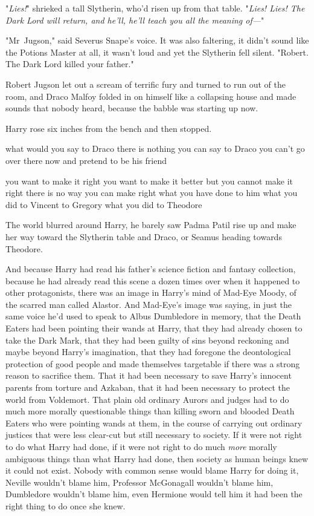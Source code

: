 "\emph{Lies!}" shrieked a tall Slytherin, who’d risen up from that table.
"\emph{Lies! Lies! The Dark Lord will return, and he’ll, he’ll teach you all
the meaning of—}"

"Mr~Jugson," said Severus Snape’s voice. It was also faltering, it didn’t
sound like the Potions Master at all, it wasn’t loud and yet the Slytherin fell
silent. "Robert. The Dark Lord killed your father."

Robert Jugson let out a scream of terrific fury and turned to run out of the
room, and Draco Malfoy folded in on himself like a collapsing house and made
sounds that nobody heard, because the babble was starting up now.

Harry rose six inches from the bench and then stopped.

what would you say to Draco there is nothing you can say to Draco you can’t go
over there now and pretend to be his friend

you want to make it right you want to make it better but you cannot make it
right there is no way you can make right what you have done to him what you did
to Vincent to Gregory what you did to Theodore

The world blurred around Harry, he barely saw Padma Patil rise up and make her
way toward the Slytherin table and Draco, or Seamus heading towards Theodore.

And because Harry had read his father’s science fiction and fantasy collection,
because he had already read this scene a dozen times over when it happened to
other protagonists, there was an image in Harry’s mind of Mad-Eye Moody, of the
scarred man called Alastor. And Mad-Eye’s image was saying, in just the same
voice he’d used to speak to Albus Dumbledore in memory, that the Death Eaters
had been pointing their wands at Harry, that they had already chosen to take
the Dark Mark, that they had been guilty of sins beyond reckoning and maybe
beyond Harry’s imagination, that they had foregone the deontological protection
of good people and made themselves targetable if there was a strong reason to
sacrifice them. That it had been necessary to save Harry’s innocent parents
from torture and Azkaban, that it had been necessary to protect the world from
Voldemort. That plain old ordinary Aurors and judges had to do much more
morally questionable things than killing sworn and blooded Death Eaters who
were pointing wands at them, in the course of carrying out ordinary justices
that were less clear-cut but still necessary to society. If it were not right
to do what Harry had done, if it were not right to do much \emph{more} morally
ambiguous things than what Harry had done, then society as human beings knew it
could not exist. Nobody with common sense would blame Harry for doing it,
Neville wouldn’t blame him, Professor McGonagall wouldn’t blame him, Dumbledore
wouldn’t blame him, even Hermione would tell him it had been the right thing to
do once she knew.

